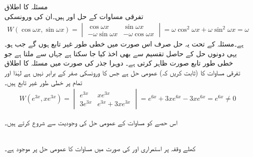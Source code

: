 \quad مسئلہ  کا اطلاق\\
تفرقی مساوات  کے حل  اور   ہیں۔ان کی ورونسکی
\begin{align*}
W(\cos \omega x,\sin \omega x)=
\begin{vmatrix}
\cos \omega x &\sin \omega x\\[0.25em]
-\omega \sin \omega x & -\omega \cos \omega x
\end{vmatrix}
=\omega \cos^2 \omega x+\omega \sin^2 \omega x=\omega
\end{align*}
ہے۔مسئلہ  کے تحت یہ حل صرف اس صورت میں خطی طور غیر تابع ہوں گے جب  ہو۔یہی دونوں حل کے حاصل تقسیم  سے بھی اخذ کیا جا سکتا ہے جہاں  سے  ملتا ہے جو خطی طور تابع صورت ظاہر کرتی ہے۔
\quad دوہرا جذر کی صورت میں مسئلہ  کا اطلاق\\
تفرقی مساوات  کا (ثابت کریں کہ) عمومی حل     ہے جس کا ورونسکی صفر کے برابر نہیں ہے لہٰذا  اور  تمام  پر خطی طور غیر تابع ہیں۔
\begin{align*}
W(e^{3x},xe^{3x})=
\begin{vmatrix}
e^{3x}& xe^{3x}\\[0.25em]
3e^{3x}&e^{3x}+3xe^{3x}
\end{vmatrix}
=e^{6x}+3xe^{6x}-3xe^{6x}=e^{6x} \ne 0
\end{align*}

اس حصے کو مساوات  کے عمومی حل کی وجودیت سے شروع کرتے ہیں۔

\quad {}\\
کھلے وقفہ  پر استمراری  اور  کی صورت میں مساوات  کا عمومی حل  پر موجود ہے۔

